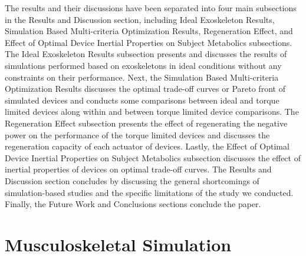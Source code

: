 \documentclass[10pt,letterpaper]{article}
\begin{document}
The results and their discussions have been separated into four main subsections in the Results and Discussion section, including Ideal Exoskeleton Results, Simulation Based Multi-criteria Optimization Results, Regeneration Effect, and Effect of Optimal Device Inertial Properties on Subject Metabolics subsections. The Ideal Exoskeleton Results subsection presents and discusses the results of simulations performed based on exoskeletons in ideal conditions without any constraints on their performance. Next, the Simulation Based Multi-criteria Optimization Results discusses the optimal trade-off curves or Pareto front of simulated devices and conducts some comparisons between ideal and torque limited devices along within and between torque limited device comparisons. The Regeneration Effect subsection presents the effect of regenerating the negative power on the performance of the torque limited devices and discusses the regeneration capacity of each actuator of devices. Lastly, the Effect of Optimal Device Inertial Properties on Subject Metabolics subsection discusses the effect of  inertial properties of devices on optimal trade-off curves. The Results and Discussion section concludes by discussing the general shortcomings of simulation-based studies and the specific limitations of the study we conducted. Finally, the Future Work and Conclusions sections conclude the paper.

\section*{Musculoskeletal Simulation}
\end{document}
